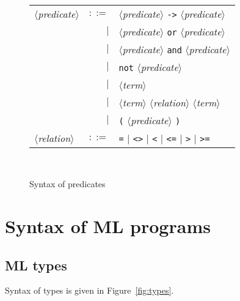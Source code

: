 \documentclass[a4paper,12pt]{report}
\newcommand{\te}[1]{\texttt{#1}}
\newcommand{\nt}[1]{$\langle$\textsl{#1}$\rangle$}
\begin{document}
\begin{figure}[htbp]
\begin{center}
\hrulefill\\
\begin{tabular}{lrl}
  \nt{predicate}
    & $::=$ & \nt{predicate} \te{->} \nt{predicate} \\
      & $|$ & \nt{predicate} \te{or} \nt{predicate} \\
      & $|$ & \nt{predicate} \te{and} \nt{predicate} \\
      & $|$ & \te{not} \nt{predicate} \\
      & $|$ & \nt{term} \\
      & $|$ & \nt{term} \nt{relation} \nt{term} \\
      & $|$ & \te{(} \nt{predicate} \te{)}
  \\[0.1em]

  \nt{relation}
    & $::=$ & \te{=} $|$ \te{<>} $|$ 
              \te{<} $|$ \te{<=} $|$ \te{>} $|$ \te{>=}
\end{tabular}\\
\hrulefill
\caption{Syntax of predicates}
\label{fig:predicates}
\end{center}            
\end{figure}


\section{Syntax of ML programs}

\subsection{ML types}

Syntax of types is given in Figure~\ref{fig:types}.
\end{document}
